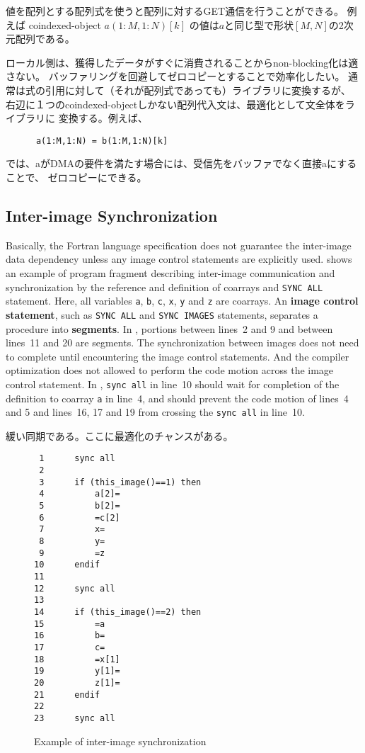 値を配列とする配列式を使うと配列に対するGET通信を行うことができる。
例えば coindexed-object $a(1:M,1:N)[k]$ の値は$a$と同じ型で形状$[M, N]$の2次元配列である。


\requirement
ローカル側は、獲得したデータがすぐに消費されることからnon-blocking化は適さない。
バッファリングを回避してゼロコピーとすることで効率化したい。
通常は式の引用に対して（それが配列式であっても）ライブラリに変換するが、
右辺に１つのcoindexed-objectしかない配列代入文は、最適化として文全体をライブラリに
変換する。例えば、
\begin{verbatim}
      a(1:M,1:N) = b(1:M,1:N)[k]
\end{verbatim}
では、aがDMAの要件を満たす場合には、受信先をバッファでなく直接aにすることで、
ゼロコピーにできる。


\subsection{Inter-image Synchronization}
Basically, the Fortran language specification does not guarantee the inter-image 
data dependency unless any image control statements are explicitly used.
 shows an example of program fragment describing inter-image communication
and synchronization by the reference and definition of coarrays and {\tt SYNC ALL} statement.
Here, all variables {\tt a}, {\tt b}, {\tt c}, {\tt x}, {\tt y} and {\tt z} are coarrays.
%
An {\bf image control statement}, such as {\tt SYNC ALL} and {\tt SYNC IMAGES} statements, 
separates a procedure into {\bf segments}. In , portions between lines~2 and 9 and 
between lines~11 and 20 are segments.
The synchronization between images does not need to complete until encountering the 
image control statements. And the compiler optimization does not allowed to perform 
the code motion across the image control statement. In , 
{\tt sync all} in line~10 should wait for completion of the definition to coarray {\tt a} 
in line~4, and should prevent the code motion of lines~4 and 5 and lines~16, 17 and 19 
from crossing the {\tt sync all} in line~10.

緩い同期である。ここに最適化のチャンスがある。

\begin{figure}[hbt]
 \begin{center}
\begin{verbatim}
 1      sync all
 2
 3      if (this_image()==1) then
 4          a[2]=
 5          b[2]=
 6          =c[2]
 7          x=
 8          y=
 9          =z
10      endif
11
12      sync all
13
14      if (this_image()==2) then
15          =a
16          b=
17          c=
18          =x[1]
19          y[1]=
20          z[1]=
21      endif
22
23      sync all

\end{verbatim}
  \caption{Example of inter-image synchronization}
  \label{fig:sync-ex}
 \end{center}
\end{figure}



